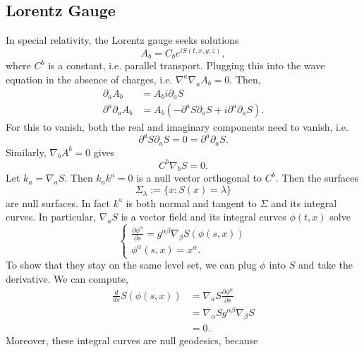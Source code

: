 \documentclass{article}
\numberwithin{equation}{section}
\begin{document}
\subsection{Lorentz Gauge}
In special relativity, the Lorentz gauge seeks solutions 
\begin{equation*}
    A_b = C_b e^{iS(t,x,y,z)},
\end{equation*}
where $C^b$ is a constant, i.e. parallel transport. Plugging this into the wave equation in the absence of charges, i.e. $\nabla^a\nabla_a A_b=0.$ Then,
\begin{align*}
    \partial_a A_b &= A_b i\partial_a S \\ 
    \partial^a\partial_a A_b &= A_b\left(-\partial^a S\partial_a S + i\partial^a\partial_a S\right).
\end{align*}
For this to vanish, both the real and imaginary components need to vanish, i.e. 
\begin{equation*}
    \partial^aS \partial_a S = 0 = \partial^a \partial_a S.
\end{equation*}
Similarly, $\nabla_b A^b=0$ gives
\begin{equation*}
    C^b\nabla_b S = 0.
\end{equation*}
Let $k_a = \nabla_a S.$ Then $k_ak^a=0$ is a null vector orthogonal to $C^b.$ Then the surfaces 
\begin{equation*}
    \Sigma_\lambda := \{x:S(x)=\lambda\}
\end{equation*}
are null surfaces. In fact $k^a$ is both normal and tangent to $\Sigma$ and its integral curves. In particular, $\nabla_a S$ is a vector field and its integral curves $\phi(t,x)$ solve
\begin{equation*}
    \begin{cases}
        \frac{\partial \phi^\alpha}{\partial s} = g^{\alpha\beta}\nabla_\beta S\left(\phi(s,x)\right) \\ 
        \phi^\alpha(s,x) = x^\alpha.
    \end{cases}
\end{equation*}
To show that they stay on the same level set, we can plug $\phi$ into $S$ and take the derivative. We can compute,
\begin{align*}
    \frac{d}{ds} S(\phi(s,x)) &= \nabla_a S \frac{\partial \phi^\alpha}{\partial s} \\ 
    &= \nabla_\alpha S g^{\alpha\beta}\nabla_\beta S \\ 
    &= 0.
\end{align*}
Moreover, these integral curves are null geodesics, because 
\end{document}
